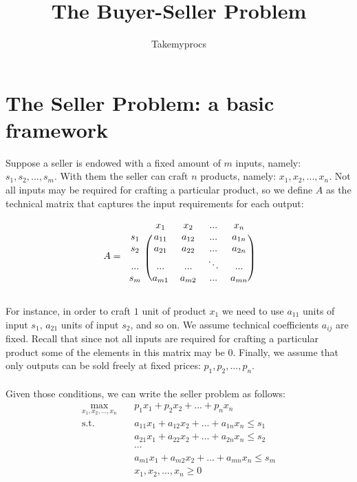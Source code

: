 \documentclass[12pt]{article}         %
\title{The Buyer-Seller Problem}
\author{Takemyprocs}
\begin{document}


\maketitle

\section{The Seller Problem: a basic framework}

Suppose a seller is endowed with a fixed amount of $m$ inputs, namely: $s_1, s_2,...,s_m$. With them the seller can craft $n$ products, namely: $x_1,x_2,...,x_n$. Not all inputs may be required for crafting a particular product, so we define $A$ as the technical matrix that captures the input requirements for each output:

\[
A = 
\begin{blockarray}{ccccc}
& x_1 & x_2 & ... & x_n \\
\begin{block}{c(cccc)}
  s_1 & a_{11} & a_{12} & ...    & a_{1n} \\
  s_2 & a_{21} & a_{22} & ...    & a_{2n} \\
  ... & ...    & ...    & \ddots & ... \\
  s_m & a_{m1} & a_{m2} & ...    & a_{mn} \\
\end{block}
\end{blockarray}
 \]

For instance, in order to craft $1$ unit of product $x_1$ we need to use $a_{11}$ units of input $s_1$, $a_{21}$ units of input $s_2$, and so on. We assume technical coefficients $a_{ij}$ are fixed. Recall that since not all inputs are required for crafting a particular product some of the elements in this matrix may be $0$. Finally, we assume that only outputs can be sold freely at fixed prices: $p_1, p_2,...,p_n$.\\
\\
Given those conditions, we can write the seller problem as follows:
\begin{equation}
\begin{aligned}
\max_{x_1,x_2,...,x_n} \quad & p_1x_1 + p_2x_2 + ... + p_nx_n \\
\textrm{s.t.} \quad & a_{11}x_1 + a_{12}x_2 + ... + a_{1n}x_n \leq s_1\\
  &a_{21}x_1 + a_{22}x_2 + ... + a_{2n}x_n \leq s_2\\
  &\cdots \\
  &a_{m1}x_1 + a_{m2}x_2 + ... + a_{mn}x_n \leq s_m\\
  &x_1,x_2,...,x_n\geq0    \\
\end{aligned}
\end{equation}
\end{document}
